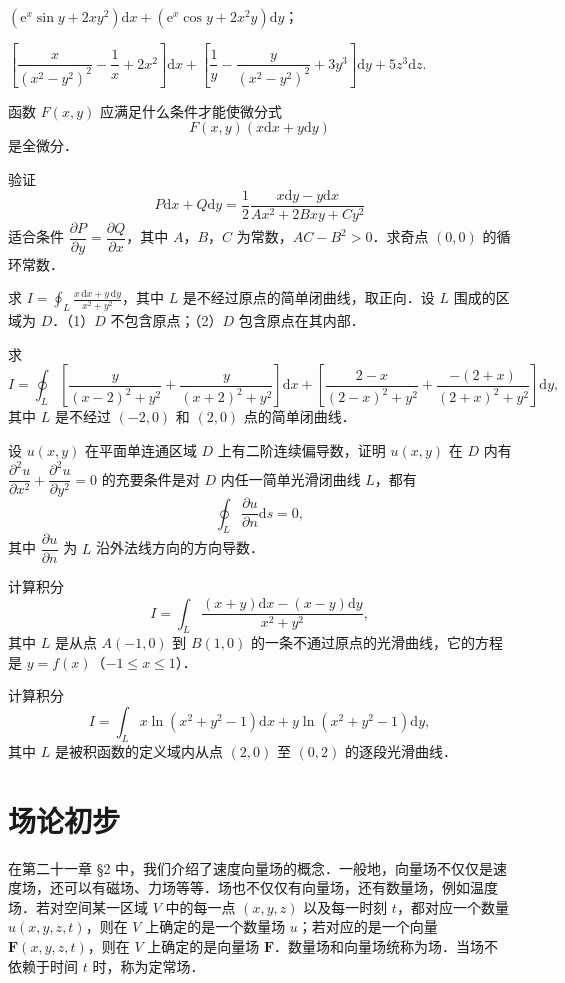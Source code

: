 \begin{xiti}
\begin{ziti}
\item $\left(\mathrm{e}^{x}\sin y+2xy^{2}\right)\mathrm{d}x+\left(\mathrm{e}^{x}\cos y+2x^{2}y\right)\mathrm{d}y$；
\item $\left[\dfrac{x}{\left(x^{2}-y^{2}\right)^{2}}-\dfrac{1}{x}+2x^{2}\right]\mathrm{d}x+\left[\dfrac{1}{y}-\dfrac{y}{\left(x^{2}-y^{2}\right)^{2}}+3y^{3}\right]\mathrm{d}y+5z^{3}\mathrm{d}z$.
\end{ziti}
\item 函数 $F(x,y)$ 应满足什么条件才能使微分式
\[
F(x,y)(x\mathrm{d}x+y\mathrm{d}y)
\]
是全微分．
\item 验证
\[
P\mathrm{d}x+Q\mathrm{d}y=\frac{1}{2}\frac{x\mathrm{d}y-y\mathrm{d}x}{Ax^{2}+2Bxy+Cy^{2}}
\]
适合条件 $\dfrac{\partial P}{\partial y}=\dfrac{\partial Q}{\partial x}$，其中 $A$，$B$，$C$ 为常数，$AC-B^{2}>0$．求奇点 $(0,0)$ 的循环常数．
\item 求 $I=\displaystyle\oint_{L}\frac{x\,\mathrm{d}x+y\,\mathrm{d}y}{x^{2}+y^{2}}$，其中 $L$ 是不经过原点的简单闭曲线，取正向．设 $L$ 围成的区域为 $D$．（1）$D$ 不包含原点；（2）$D$ 包含原点在其内部．
\item 求
\[
I=\oint_{L}\left[\frac{y}{(x-2)^{2}+y^{2}}+\frac{y}{(x+2)^{2}+y^{2}}\right]\mathrm{d}x+\left[\frac{2-x}{(2-x)^{2}+y^{2}}+\frac{-(2+x)}{(2+x)^{2}+y^{2}}\right]\mathrm{d}y,
\]
其中 $L$ 是不经过 $(-2,0)$ 和 $(2,0)$ 点的简单闭曲线．
\item 设 $u(x,y)$ 在平面单连通区域 $D$ 上有二阶连续偏导数，证明 $u(x,y)$ 在 $D$ 内有 $\dfrac{\partial^{2}u}{\partial x^{2}}+\dfrac{\partial^{2}u}{\partial y^{2}}=0$ 的充要条件是对 $D$ 内任一简单光滑闭曲线 $L$，都有
\[
\oint_{L}\frac{\partial u}{\partial n}\mathrm{d}s=0,
\]
其中 $\dfrac{\partial u}{\partial n}$ 为 $L$ 沿外法线方向的方向导数．
\item 计算积分
\[
I=\int_{L}\frac{(x+y)\mathrm{d}x-(x-y)\mathrm{d}y}{x^{2}+y^{2}},
\]
其中 $L$ 是从点 $A(-1,0)$ 到 $B(1,0)$ 的一条不通过原点的光滑曲线，它的方程是 $y=f(x)$（$-1\leqslant x\leqslant 1$）．
\item 计算积分
\[
I=\int_{L}x\ln(x^{2}+y^{2}-1)\mathrm{d}x+y\ln(x^{2}+y^{2}-1)\mathrm{d}y,
\]
其中 $L$ 是被积函数的定义域内从点 $(2,0)$ 至 $(0,2)$ 的逐段光滑曲线．
\end{xiti}

\section{场论初步}

在第二十一章 §2 中，我们介绍了速度向量场的概念．一般地，向量场不仅仅是速度场，还可以有磁场、力场等等．场也不仅仅有向量场，还有数量场，例如温度场．若对空间某一区域 $V$ 中的每一点 $(x,y,z)$ 以及每一时刻 $t$，都对应一个数量 $u(x,y,z,t)$，则在 $V$ 上确定的是一个数量场 $u$；若对应的是一个向量 $\bm{F}(x,y,z,t)$，则在 $V$ 上确定的是向量场 $\bm{F}$．数量场和向量场统称为场．当场不依赖于时间 $t$ 时，称为定常场．

